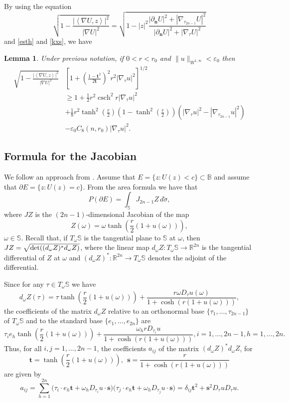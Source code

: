 \documentclass[11pt]{amsart}
\newtheorem{lemma}[theorem]{Lemma}
\def\det{{\rm det}}
\newcommand{\csch}{\operatorname{csch}}
\numberwithin{equation}{section}
\def\ge{\geqslant}
\begin{document}
By using the equation
$${\sqrt{1-\frac{|\left<\nabla U, z\right>|^2}{|\nabla U|^2}}}=\sqrt{1-|z|^2 \frac{|\partial_{\mathbf{n}} U|^2 + |\nabla_{\tau_{2n-1}} U|^2}{|\partial_{\mathbf{n}} U|^2 + |\nabla_\tau U|^2}}$$ and \eqref{esth} and \eqref{kxs},
we have
\begin{lemma}\label{lema22} Under previous notation, %
if $0<r<r_0$ and $\|u\|_{W^{1,\infty}}<\varepsilon_0$ then
\[\begin{split}{\sqrt{1-\frac{|\left<\nabla U, z\right>|^2}{|\nabla U|^2}}}&\left[ 1 + \left( \frac{1 - \mathbf{t}^2}{2\mathbf{t}} \right)^2 r^2 |\nabla_\tau u|^2 \right]^{1/2}
\\&\ge 1+\frac{1}{2}  r^2 \csch^2 r |\nabla_\tau u|^2\\&+\frac{1}{8} r^2 \tanh^2(\frac{r}{2})(1-\tanh^2(\frac{r}{2}))(|\nabla_\tau u|^2-|\nabla_{\tau_{2n-1}} u|^2) \\&-\varepsilon_0 C_{8}(n,r_0)|\nabla_\tau u|^2.\end{split}\]
\end{lemma}
\subsection{Formula for the Jacobian} We follow an approach from \cite{fus}. Assume that $E=\{z: U(z)<c\}\subset \mathbb{B}$ and assume that $\partial E= \{z: U(z)=c\}$.
From the area formula we have that
\begin{equation}
   P(\partial E) = \int_{\mathbb{S}} J_{2n-1}Z \, d\tilde \sigma, \tag{3.4}
\end{equation}
where $JZ$ is the $(2n-1)$-dimensional Jacobian of the map $$Z(\omega) = \omega\tanh\left(\frac{r}{2}(1 + u(\omega))\right),$$ $\omega \in \mathbb{S}.$ Recall that, if $T_\omega \mathbb{S}$ is the tangential plane to $\mathbb{S}$ at $\omega$, then $JZ = \sqrt{\det((d_\omega Z)^* d_\omega Z)}$, where the linear map $d_\omega Z : T_\omega \mathbb{S} \to \mathbb{R}^{2n}$ is the tangential differential of $Z$ at $\omega$ and $(d_\omega Z)^* : \mathbb{R}^{2n} \to T_\omega \mathbb{S}$ denotes the adjoint of the differential.

Since for any $\tau \in T_\omega \mathbb{S}$ we have $$d_\omega Z(\tau) = \tau \tanh\left(\frac{r}{2}(1 + u(\omega))\right)  +  \frac{r \omega D_\tau u(\omega) }{1+\cosh (r (1+u(\omega)))},$$ the coefficients of the matrix $d_\omega Z$ relative to an orthonormal base $\{\tau_1, \dots, \tau_{2n-1}\}$ of $T_\omega \mathbb{S}$ and to the standard base $\{e_1, \dots, e_{2n}\}$ are
\[
\tau_i  e_h\tanh\left(\frac{r}{2}(1 + u(\omega))\right) +  \frac{\omega_h r D_{\tau_i} u}{1+\cosh (r (1+u(\omega)))}, i = 1, \dots, 2n-1, h=1, \dots, 2n.
\]
Thus, for all $i, j = 1, \dots, 2n-1$, the coefficients $a_{ij}$ of the matrix $(d_\omega Z)^* d_\omega Z$, for $$\mathbf{t}=\tanh\left(\frac{r}{2}(1 + u(\omega))\right),\ \
\mathbf{s}=\frac{ r }{1+\cosh (r (1+u(\omega)))}$$ are given by
\[
a_{ij} = \sum_{h=1}^{2n} \big(\tau_i \cdot e_h\mathbf{t} + \omega _h D_{\tau_i} u\cdot  \mathbf{s}\big)\big(\tau_j \cdot e_h\mathbf{t} + \omega_h D_{\tau_j} u \cdot \mathbf{s}\big)
= \delta_{ij}\mathbf{t}^2 + \mathbf{s}^2D_\tau u D_\tau u.
\]
\end{document}

